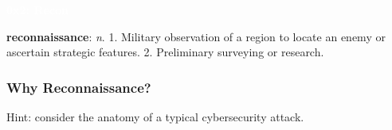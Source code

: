 \documentclass[aspectratio=169]{beamer}
\begin{document}
{
\begin{frame}
\huge{\textcolor{white}{\textbf{0x2: Recon}}}
\end{frame}
}


\begin{frame}%
    \textbf{reconnaissance}: \textit{n}. 1. Military observation of a region to locate an enemy or ascertain strategic features. 2. Preliminary surveying or research.
\end{frame}

\begin{frame}
    \frametitle{Why Reconnaissance?}
    \begin{center}
        {\fontsize{70}{80}\selectfont \faQuestionCircle}
        \vfill
        Hint: consider the anatomy of a typical cybersecurity attack.
    \end{center}
\end{frame}
\end{document}
